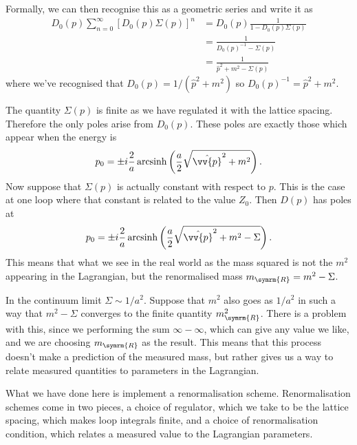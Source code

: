 \documentclass[fleqn]{NotesClass}
\DeclareMathOperator{\arcsinh}{arcsinh}
\newcommand{\renormalised}{\symrm{R}}
\begin{document}
    Formally, we can then recognise this as a geometric series and write it as
    \begin{align}
        D_0(p) \sum_{n = 0}^{\infty} [D_0(p)\Sigma(p)]^n &= D_0(p) \frac{1}{1 - D_0(p)\Sigma(p)}\\
        &= \frac{1}{D_0(p)^{-1} - \Sigma(p)}\\
        &= \frac{1}{\hat{p}^2 + m^2 - \Sigma(p)}
    \end{align}
    where we've recognised that \(D_0(p) = 1/(\hat{p}^2 + m^2)\) so \(D_0(p)^{-1} = \hat{p}^2 + m^2\).
    
    The quantity \(\Sigma(p)\) is finite as we have regulated it with the lattice spacing.
    Therefore the only poles arise from \(D_0(p)\).
    These poles are exactly those which appear when the energy is
    \begin{equation}
        p_0 = \pm i\frac{2}{a} \arcsinh \left( \frac{a}{2}\sqrt{\hat{\vv{p}}^2 + m^2} \right).
    \end{equation}
    Now suppose that \(\Sigma(p)\) is actually constant with respect to \(p\).
    This is the case at one loop where that constant is related to the value \(Z_0\).
    Then \(D(p)\) has poles at
    \begin{equation}
        p_0 = \pm i\frac{2}{a}\arcsinh \left( \frac{a}{2}\sqrt{\hat{\vv{p}}^2 + m^2 - \Sigma} \right).
    \end{equation}
    This means that what we see in the real world as the mass squared is not the \(m^2\) appearing in the Lagrangian, but the renormalised mass \(m_{\renormalised} = m^2 - \Sigma\).
    
    In the continuum limit \(\Sigma \sim 1/a^2\).
    Suppose that \(m^2\) also goes as \(1/a^2\) in such a way that \(m^2 - \Sigma\) converges to the finite quantity \(m_{\renormalised}^2\).
    There is a problem with this, since we performing the sum \(\infty - \infty\), which can give any value we like, and we are choosing \(m_{\renormalised}\) as the result.
    This means that this process doesn't make a prediction of the measured mass, but rather gives us a way to relate measured quantities to parameters in the Lagrangian.
    
    What we have done here is implement a renormalisation scheme.
    Renormalisation schemes come in two pieces, a choice of regulator, which we take to be the lattice spacing, which makes loop integrals finite, and a choice of renormalisation condition, which relates a measured value to the Lagrangian parameters.
    
\end{document}
